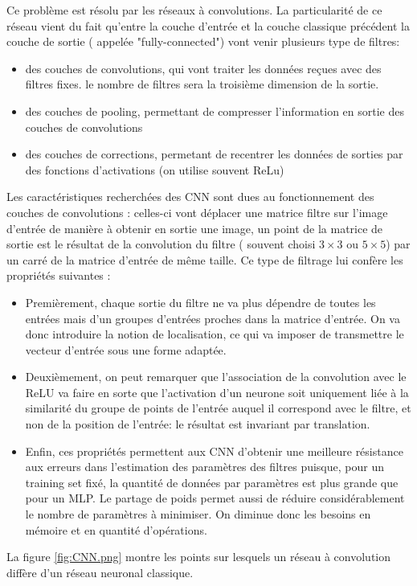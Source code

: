 \documentclass[
    10pt,
    a4paper,
    oneside,
    headinclude,footinclude,
    BCOR=5mm,
    captions=tableabove
]{scrartcl}
\begin{document}
Ce problème est résolu par les réseaux à convolutions. La particularité de ce réseau vient du fait qu'entre la couche d'entrée et la couche classique précédent la couche de sortie ( appelée "fully-connected") vont venir plusieurs type de filtres:
\begin{itemize}
	\item des couches de convolutions, qui vont traiter les données reçues avec des filtres fixes. le nombre de filtres sera la troisième dimension de la sortie.
	\item des couches de pooling, permettant de compresser l'information en sortie des couches de convolutions
	\item des couches de corrections, permetant de recentrer les données de sorties par des fonctions d'activations (on utilise souvent ReLu)
\end{itemize}

Les caractéristiques recherchées des CNN sont dues au fonctionnement des couches de convolutions : celles-ci vont déplacer une matrice filtre sur l'image d'entrée de manière à obtenir en sortie une image, un point de la matrice de sortie est le résultat de la convolution du filtre ( souvent choisi $3\times3$ ou $5\times5$) par un carré de la matrice d'entrée de même taille.
Ce type de filtrage lui confère les propriétés suivantes :
\begin{itemize}
	\item Premièrement, chaque sortie du filtre ne va plus dépendre de toutes les entrées mais d'un groupes d'entrées proches dans la matrice d'entrée. On va donc introduire la notion de localisation, ce qui va imposer de transmettre le vecteur d'entrée sous une forme adaptée.
	\item Deuxièmement, on peut remarquer que l'association de la convolution avec le ReLU va faire en sorte que l'activation d'un neurone soit uniquement liée à la similarité du groupe de points de l'entrée auquel il correspond avec le filtre, et non de la position de l'entrée: le résultat est invariant par translation.
	\item Enfin, ces propriétés permettent aux CNN d'obtenir une meilleure résistance aux erreurs dans l'estimation des paramètres des filtres puisque, pour un training set fixé, la quantité de données par paramètres est plus grande que pour un MLP. Le partage de poids permet aussi de réduire considérablement le nombre de paramètres à minimiser. On diminue donc les besoins en mémoire et en quantité d'opérations.
\end{itemize}
La figure \ref{fig:CNN.png} montre les points sur lesquels un réseau à convolution diffère d'un réseau neuronal classique.
\end{document}
